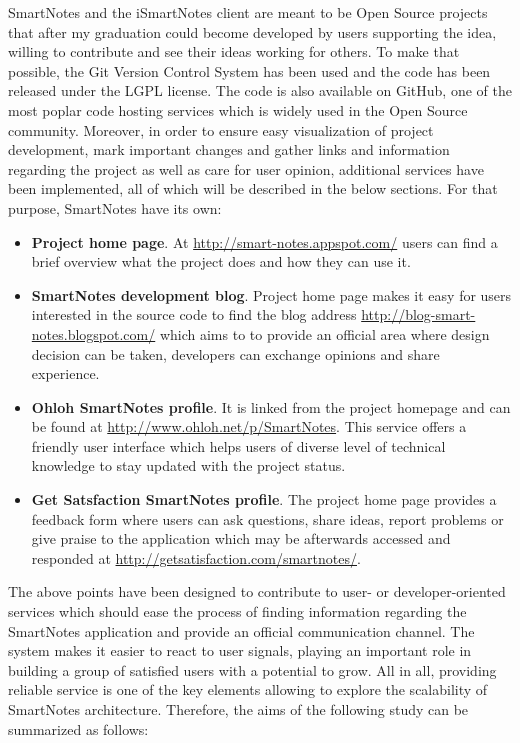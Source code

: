 SmartNotes and the iSmartNotes client are meant to be Open Source projects that after my graduation could become developed by users supporting the idea, willing to contribute and see their ideas working for others. To make that possible, the Git Version Control System has been used and the code has been released under the LGPL license. The code is also available on GitHub, one of the most poplar code hosting services which is widely used in the Open Source community. Moreover, in order to ensure easy visualization of project development, mark important changes and gather links and information regarding the project as well as care for user opinion, additional services have been implemented, all of which will be described in the below sections. For that purpose, SmartNotes have its own:
\begin{itemize}
\item{\textbf{Project home page}. At \url{http://smart-notes.appspot.com/} users can find a brief overview what the project does and how they can use it.}
\item{\textbf{SmartNotes development blog}. Project home page makes it easy for users interested in the source code to find the blog address \url{http://blog-smart-notes.blogspot.com/} which aims to to provide an official area where design decision can be taken, developers can exchange opinions and share experience.}
\item{\textbf{Ohloh SmartNotes profile}. It is linked from the project homepage and can be found at \url{http://www.ohloh.net/p/SmartNotes}. This service offers a friendly user interface which helps users of diverse level of technical knowledge to stay updated with the project status.}
\item{\textbf{Get Satsfaction SmartNotes profile}. The project home page provides a feedback form where users can ask questions, share ideas, report problems or give praise to the application which may be afterwards accessed and responded at \url{http://getsatisfaction.com/smartnotes/}.}
\end{itemize}
The above points have been designed to contribute to user- or developer-oriented services which should ease the process of finding information regarding the SmartNotes application and provide an official communication channel. The system makes it easier to react to user signals, playing an important role in building a group of satisfied users with a potential to grow. All in all, providing reliable service is one of the key elements allowing to explore the scalability of SmartNotes architecture. Therefore, the aims of the following study can be summarized as follows:
